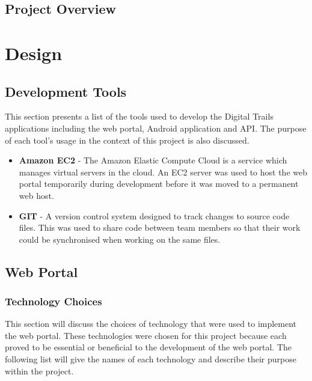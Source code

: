 \documentclass[11pt,a4paper]{report}
\begin{document}
\section{Project Overview}
\label{sec:project-overview}

\chapter{Design}
\newpage
\label{sec:design}

\section{Development Tools}

This section presents a list of the tools used to develop the Digital Trails applications including the web portal, Android application and API. The purpose of each tool's usage in the context of this project is also discussed.

\begin{itemize}

\item \textbf{Amazon EC2} - The Amazon Elastic Compute Cloud is a service which manages virtual servers in the cloud. An EC2 server was used to host the web portal temporarily during development before it was moved to a permanent web host.
   
\item \textbf{GIT} - A version control system designed to track changes to source code files. This was used to share code between team members so that their work could be synchronised when working on the same files.

\end{itemize}

\section{Web Portal}
\label{sec:web-portal-design}
\subsection{Technology Choices}

\label{sec:portal-technology-choices}



This section will discuss the choices of technology that were used to implement the web portal. These technologies were chosen for this project because each proved to be essential or beneficial to the development of the web portal. The following list will give the names of each technology and describe their purpose within the project.
\end{document}
